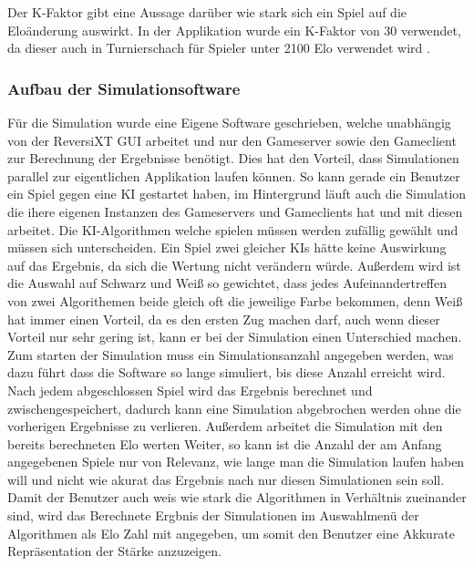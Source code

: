 \documentclass[12pt,a4paper,bibliography=totocnumbered,listof=totocnumbered]{article}
\begin{document}
Der K-Faktor gibt eine Aussage darüber wie stark sich ein Spiel auf die Eloänderung auswirkt. In der Applikation wurde ein K-Faktor von 30 verwendet, da 
dieser auch in Turnierschach für Spieler unter 2100 Elo verwendet wird \cite{EloFormulas}.

\subsubsection{Aufbau der Simulationsoftware}
Für die Simulation wurde eine Eigene Software geschrieben, welche unabhängig von der ReversiXT GUI arbeitet und nur den Gameserver 
sowie den Gameclient zur Berechnung der Ergebnisse benötigt. Dies hat den Vorteil, dass Simulationen parallel zur eigentlichen Applikation laufen können.
So kann gerade ein Benutzer ein Spiel gegen eine KI gestartet haben, im Hintergrund läuft auch die Simulation die ihere eigenen Instanzen des 
Gameservers und Gameclients hat und mit diesen arbeitet. 
Die KI-Algorithmen welche spielen müssen werden zufällig gewählt und müssen sich unterscheiden. Ein Spiel zwei gleicher KIs hätte keine Auswirkung auf das 
Ergebnis, da sich die Wertung nicht verändern würde. Außerdem wird ist die Auswahl auf Schwarz und Weiß so gewichtet, dass jedes Aufeinandertreffen von zwei
Algorithemen beide gleich oft die jeweilige Farbe bekommen, denn Weiß hat immer einen Vorteil, da es den ersten Zug machen darf, auch wenn dieser 
Vorteil nur sehr gering ist, kann er bei der Simulation einen Unterschied machen.
\\
Zum starten der Simulation muss ein Simulationsanzahl angegeben werden, was dazu führt dass die Software so lange simuliert, bis diese Anzahl erreicht wird.
Nach jedem abgeschlossen Spiel wird das Ergebnis berechnet und zwischengespeichert, dadurch kann eine Simulation abgebrochen werden ohne die vorherigen 
Ergebnisse zu verlieren. Außerdem arbeitet die Simulation mit den bereits berechneten Elo werten Weiter, so kann ist die Anzahl der am Anfang angegebenen 
Spiele nur von Relevanz, wie lange man die Simulation laufen haben will und nicht wie akurat das Ergebnis nach nur diesen Simulationen sein soll.
\\
Damit der Benutzer auch weis wie stark die Algorithmen in Verhältnis zueinander sind, wird das Berechnete Ergbnis der Simulationen im Auswahlmenü der 
Algorithmen als Elo Zahl mit angegeben, um somit den Benutzer eine Akkurate Repräsentation der Stärke anzuzeigen.
\end{document}
